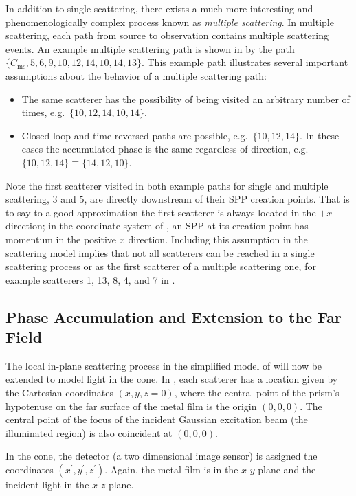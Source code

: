 In addition to single scattering, there exists a much more interesting and
phenomenologically complex process known as \textit{multiple scattering}.  In
multiple scattering, each path from source to observation contains multiple
scattering events.  An example multiple scattering path is shown
in  by the path
$\{C_\mathrm{ms},5,6,9,10,12,14,10,14,13\}$.  This example path illustrates
several important assumptions about the behavior of a multiple scattering
path:
\begin{itemize}
\item The same scatterer has the possibility of being visited an arbitrary
				number of times, e.g.\ $\{10,12,14,10,14\}$.
\item Closed loop and time reversed paths are possible, e.g.\ $\{10,12,14\}$.
				In these cases the accumulated phase is the same regardless of
				direction, e.g. $\{10,12,14\} \equiv \{14,12,10\}$.
\end{itemize}

Note the first scatterer visited in both example paths for single and multiple
scattering, $3$ and $5$, are directly downstream of their SPP creation points.
That is to say to a good approximation the first scatterer is always located
in the $+x$ direction; in the coordinate system of
, an SPP at its creation point has momentum in
the positive $x$ direction.  Including this assumption in the scattering model
implies that not all scatterers can be reached in a single scattering process
or as the first scatterer of a multiple scattering one, for example
scatterers 1, 13, 8, 4, and 7 in .

\subsection{Phase Accumulation and Extension to the Far Field} 
The local in-plane scattering process in the simplified model of
 will now be extended to model light in the cone.
In , each scatterer has a location given by the
Cartesian coordinates $(x,y,z=0)$, where the central point of the prism's
hypotenuse on the far surface of the metal film is the origin $(0,0,0)$.  The
central point of the focus of the incident Gaussian excitation beam (the
illuminated region) is also coincident at $(0,0,0)$.

In the cone, the detector (a two dimensional image sensor) is assigned the
coordinates $(x^\prime,y^\prime,z^\prime)$.  Again, the metal film is in the
$x$-$y$ plane and the incident light in the $x$-$z$ plane.

